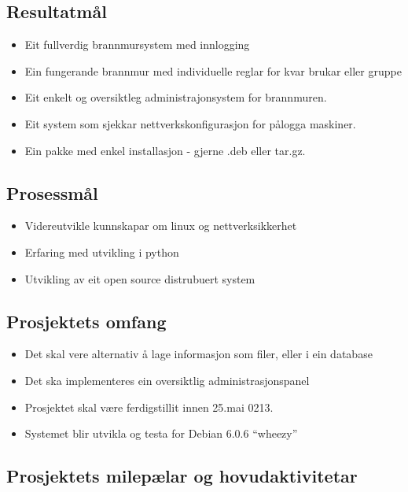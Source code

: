 \documentclass[12pt]{article}
\begin{document}
\subsection{Resultatmål}

\begin{itemize}
\item Eit fullverdig brannmursystem med innlogging
\end{itemize}
\begin{itemize}
\item Ein fungerande brannmur med individuelle reglar for kvar brukar eller gruppe
\item Eit enkelt og oversiktleg administrajonsystem for brannmuren.
\item Eit system som sjekkar nettverkskonfigurasjon for pålogga maskiner.
\item Ein pakke med enkel installasjon - gjerne .deb eller tar.gz.
\end{itemize}
\subsection{Prosessmål}

\begin{itemize}
\item Videreutvikle kunnskapar om linux og nettverksikkerhet
\item Erfaring med utvikling i python
\item Utvikling av eit open source distrubuert system
\end{itemize}
\subsection{Prosjektets omfang}

\begin{itemize}
\item Det skal vere alternativ å lage informasjon som filer, eller i ein database
\item Det ska implementeres ein oversiktlig administrasjonspanel
\item Prosjektet skal være ferdigstillit innen 25.mai 0213.
\item Systemet blir utvikla og testa for Debian 6.0.6 “wheezy”
\end{itemize}
\subsection{Prosjektets milepælar og hovudaktivitetar}
\end{document}
